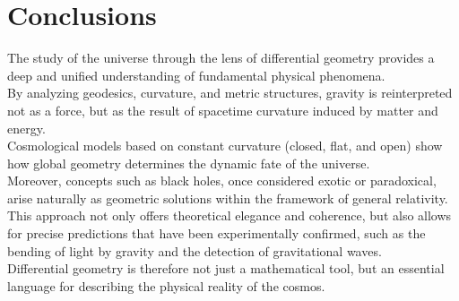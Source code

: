 \documentclass{aleph-revista}
\begin{document}
\section{Conclusions}
The study of the universe through the lens of differential geometry provides a deep and unified understanding of fundamental physical phenomena.\\
By analyzing geodesics, curvature, and metric structures, gravity is reinterpreted not as a force, but as the result of spacetime curvature induced by matter and energy.\\
Cosmological models based on constant curvature (closed, flat, and open) show how global geometry determines the dynamic fate of the universe.\\
Moreover, concepts such as black holes, once considered exotic or paradoxical, arise naturally as geometric solutions within the framework of general relativity.\\
This approach not only offers theoretical elegance and coherence, but also allows for precise predictions that have been experimentally confirmed, such as the bending of light by gravity and the detection of gravitational waves.\\
Differential geometry is therefore not just a mathematical tool, but an essential language for describing the physical reality of the cosmos.
\newpage
\nocite{*}
\printbibliography
\end{document}
